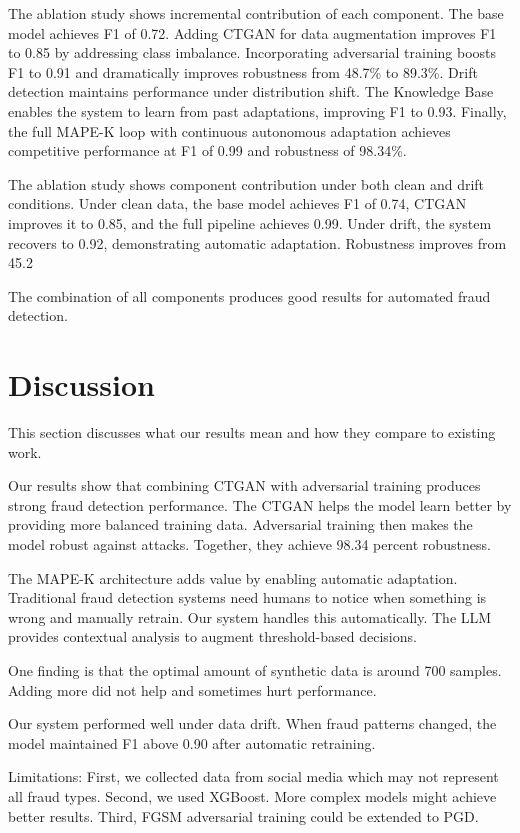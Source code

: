 \documentclass{svproc}
\begin{document}
The ablation study shows incremental contribution of each component. The base model achieves F1 of 0.72. Adding CTGAN for data augmentation improves F1 to 0.85 by addressing class imbalance. Incorporating adversarial training boosts F1 to 0.91 and dramatically improves robustness from 48.7\% to 89.3\%. Drift detection maintains performance under distribution shift. The Knowledge Base enables the system to learn from past adaptations, improving F1 to 0.93. Finally, the full MAPE-K loop with continuous autonomous adaptation achieves competitive performance at F1 of 0.99 and robustness of 98.34\%.

The ablation study shows component contribution under both clean and drift conditions. Under clean data, the base model achieves F1 of 0.74, CTGAN improves it to 0.85, and the full pipeline achieves 0.99. Under drift, the system recovers to 0.92, demonstrating automatic adaptation. Robustness improves from 45.2%

The combination of all components produces good results for automated fraud detection.

\section{Discussion}\label{sec:discussion}
This section discusses what our results mean and how they compare to existing work.

Our results show that combining CTGAN with adversarial training produces strong fraud detection performance. The CTGAN helps the model learn better by providing more balanced training data. Adversarial training then makes the model robust against attacks. Together, they achieve 98.34 percent robustness.

The MAPE-K architecture adds value by enabling automatic adaptation. Traditional fraud detection systems need humans to notice when something is wrong and manually retrain. Our system handles this automatically. The LLM provides contextual analysis to augment threshold-based decisions.

One finding is that the optimal amount of synthetic data is around 700 samples. Adding more did not help and sometimes hurt performance.

Our system performed well under data drift. When fraud patterns changed, the model maintained F1 above 0.90 after automatic retraining.

Limitations: First, we collected data from social media which may not represent all fraud types. Second, we used XGBoost. More complex models might achieve better results. Third, FGSM adversarial training could be extended to PGD.
\end{document}
